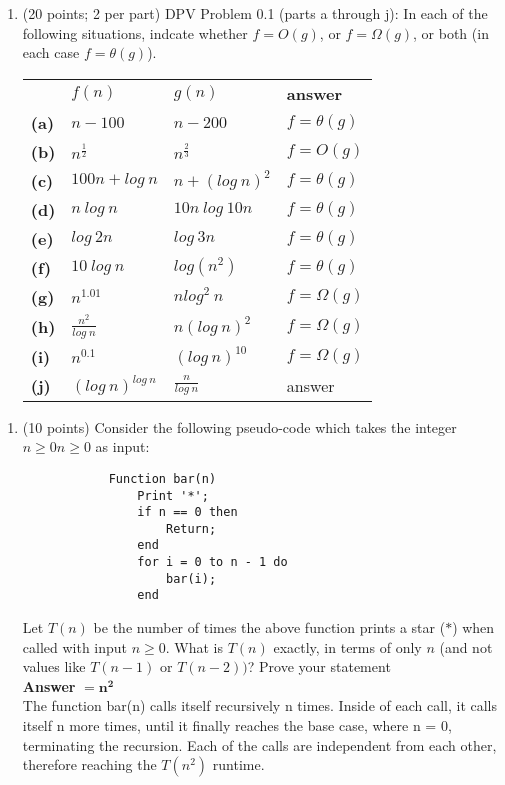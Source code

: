 \documentclass{article}
\begin{document}
    \begin{enumerate}[label=\textbf{Q1}]
        \item (20 points; 2 per part) DPV Problem 0.1 (parts a through j): In each of the following situations, indcate whether $f = O(g)$, or $f = \Omega(g)$, or both (in each case $f = \theta(g)$).\\[0.25in]
        \begin{tabular}{l l l l}
            &$f(n)$ & $g(n)$ & \textbf{answer}\\
            \textbf{(a)} & $n - 100$ & $n - 200$ & $f = \theta(g)$\\
            \textbf{(b)} & $n^{\frac{1}{2}}$ & $n^{\frac{2}{3}}$ & $f = O(g)$\\
            \textbf{(c)} & $100n + log\ n$ & $n + (log\ n)^2$ & $f = \theta(g)$\\
            \textbf{(d)} & $n\ log\ n$ & $10n\ log\ 10n$ & $f = \theta(g)$\\
            \textbf{(e)} & $log\ 2n$ & $log\ 3n$ & $f = \theta(g)$\\
            \textbf{(f)} & $10\ log\ n$ & $log(n^2)$ & $f = \theta(g)$\\
            \textbf{(g)} & $n^{1.01}$ & $nlog^2\ n$ & $f = \Omega(g)$\\
            \textbf{(h)} & $\frac{n^2}{log\ n}$ & $n(log\ n)^2$ & $f = \Omega(g)$\\
            \textbf{(i)} & $n^{0.1}$ & $(log\ n)^{10}$ & $f = \Omega(g)$\\
            \textbf{(j)} & $(log\ n)^{log\ n}$ & $\frac{n}{log\ n}$ & answer\\
        \end{tabular}
    \end{enumerate}

    \begin{enumerate}[label=\textbf{Q2}]
        \item (10 points) Consider the following pseudo-code which takes the integer $n \geq 0n \geq 0$ as input:
        \begin{verbatim}
            Function bar(n)
                Print '*';
                if n == 0 then
                    Return;
                end
                for i = 0 to n - 1 do
                    bar(i);
                end
        \end{verbatim}
        Let $T(n)$ be the number of times the above function prints a star ($*$) when called with input $n \geq 0$.
        What is $T(n)$ exactly, in terms of only $n$ (and not values like $T(n - 1)$ or $T(n - 2))$? Prove your
        statement\\[0.25in]
        \textbf{Answer} $= \mathbf{n^2}$\\
        The function bar(n) calls itself recursively n times. Inside of each call, it calls itself n more times,
        until it finally reaches the base case, where n = 0, terminating the recursion. Each of the calls are
        independent from each other, therefore reaching the $T(n^2)$ runtime.
    \end{enumerate}
\end{document}
